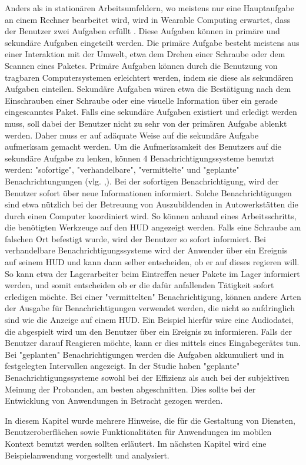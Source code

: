 Anders als in stationären Arbeitsumfeldern, wo meistens nur eine Hauptaufgabe an einem Rechner bearbeitet wird, wird in Wearable Computing erwartet, dass der Benutzer zwei Aufgaben erfüllt \cite{Witt:2006hi}. Diese Aufgaben können in primäre und sekundäre Aufgaben eingeteilt werden. Die primäre Aufgabe besteht meistens aus einer Interaktion mit der Umwelt, etwa dem Drehen einer Schraube oder dem Scannen eines Paketes. Primäre Aufgaben können durch die Benutzung von tragbaren Computersystemen erleichtert werden, indem sie diese als sekundären Aufgaben einteilen. Sekundäre Aufgaben wären etwa die Bestätigung nach dem Einschrauben einer Schraube oder eine visuelle Information über ein gerade eingescanntes Paket. Falls eine sekundäre Aufgaben existiert und erledigt werden muss, soll dabei der Benutzer nicht zu sehr von der primären Aufgabe ablenkt werden. Daher muss er auf adäquate Weise auf die sekundäre Aufgabe aufmerksam gemacht werden. Um die Aufmerksamkeit des Benutzers auf die sekundäre Aufgabe zu lenken, können 4 Benachrichtigungssysteme benutzt werden: "sofortige", "verhandelbare", "vermittelte" und "geplante" Benachrichtungungen (vlg. \cite{McFarlane:1999um},\cite{Nilsson:cq}). Bei der sofortigen Benachrichtigung, wird der Benutzer sofort über neue Informationen informiert. Solche Benachrichtigungen sind etwa nützlich bei der Betreuung von Auszubildenden in Autowerkstätten die durch einen Computer koordiniert wird. So können anhand eines Arbeitsschritts, die benötigten Werkzeuge auf den HUD angezeigt werden. Falls eine Schraube am falschen Ort befestigt wurde, wird  der Benutzer so sofort informiert. Bei verhandelbare Benachrichtigungssysteme wird der Anwender über ein Ereignis auf seinem HUD und kann dann selber entscheiden, ob er auf dieses regieren will. So kann etwa der Lagerarbeiter beim Eintreffen neuer Pakete im Lager informiert werden, und somit entscheiden ob er die dafür anfallenden Tätigkeit sofort erledigen möchte. Bei einer "vermittelten" Benachrichtigung, können andere Arten der Ausgabe für Benachrichtigungen verwendet werden, die nicht so aufdringlich sind wie die Anzeige auf einem HUD. Ein Beispiel hierfür wäre eine Audiodatei, die abgespielt wird um den Benutzer über ein Ereignis zu informieren. Falls der Benutzer darauf Reagieren möchte, kann er  dies mittels eines Eingabegerätes tun. Bei "geplanten" Benachrichtigungen werden die Aufgaben  akkumuliert und in festgelegten Intervallen angezeigt. In der Studie \cite{Nilsson:cq}  haben "geplante" Benachrichtigungssysteme sowohl bei der Effizienz als auch bei der subjektiven Meinung der Probanden,  am besten abgeschnitten. Dies sollte bei der Entwicklung von Anwendungen in Betracht gezogen werden.


In diesem Kapitel wurde mehrere Hinweise, die für die Gestaltung von Diensten, Benutzeroberflächen sowie Funktionalitäten für Anwendungen im mobilen Kontext benutzt werden sollten erläutert. Im nächsten Kapitel wird eine Beispielanwendung vorgestellt und analysiert.

